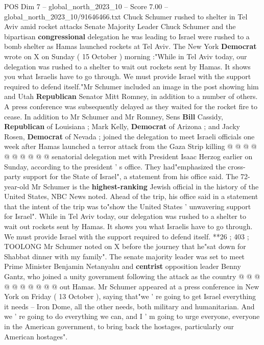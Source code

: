 \begin{textsample}{POS Dim 7 – global\_north\_2023\_10 – Score 7.00 – global\_north\_2023\_10/91646466.txt}  \label{ex:f7_pos_252}
Chuck Schumer rushed to shelter in Tel Aviv amid rocket attacks Senate Majority Leader Chuck Schumer and the bipartisan \textbf{congressional} delegation he was leading to Israel were rushed to a bomb shelter as Hamas launched rockets at Tel Aviv.
The New York \textbf{Democrat} wrote on X on Sunday ( 15 October ) morning :"While in Tel Aviv today, our delegation was rushed to a shelter to wait out rockets sent by Hamas.
It shows you what Israelis have to go through.
We must provide Israel with the support required to defend itself."Mr Schumer included an image in the post showing him and Utah \textbf{Republican} Senator Mitt Romney, in addition to a number of others.
A press conference was subsequently delayed as they waited for the rocket fire to cease.
In addition to Mr Schumer and Mr Romney, Sens \textbf{Bill} Cassidy, \textbf{Republican} of Louisiana ; Mark Kelly, \textbf{Democrat} of Arizona ; and Jacky Rosen, \textbf{Democrat} of Nevada ; joined the delegation to meet Israeli officials one week after Hamas launched a terror attack from the Gaza Strip killing @ @ @ @ @ @ @ @ @ @ senatorial delegation met with President Isaac Herzog earlier on Sunday, according to the president ' s office.
They had"emphasized the cross-party support for the State of Israel", a statement from his office said.
The 72-year-old Mr Schumer is the \textbf{highest-ranking} Jewish official in the history of the United States, NBC News noted.
Ahead of the trip, his office said in a statement that the intent of the trip was to"show the United States ' unwavering support for Israel".
While in Tel Aviv today, our delegation was rushed to a shelter to wait out rockets sent by Hamas.
It shows you what Israelis have to go through.
We must provide Israel with the support required to defend itself. **26 ; 403 ; TOOLONG Mr Schumer noted on X before the journey that he"sat down for Shabbat dinner with my family".
The senate majority leader was set to meet Prime Minister Benjamin Netanyahu and \textbf{centrist} opposition leader Benny Gantz, who joined a unity government following the attack as the country @ @ @ @ @ @ @ @ @ @ out Hamas.
Mr Schumer appeared at a press conference in New York on Friday ( 13 October ), saying that"we ' re going to get Israel everything it needs -- Iron Dome, all the other needs, both military and humanitarian.
And we ' re going to do everything we can, and I ' m going to urge everyone, everyone in the American government, to bring back the hostages, particularly our American hostages".

\end{textsample}
